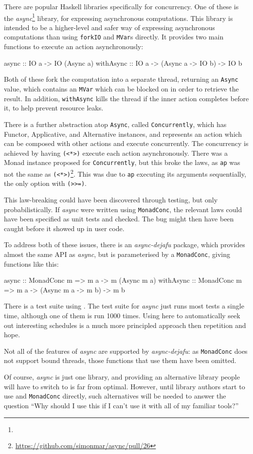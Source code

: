 There are popular Haskell libraries specifically for concurrency. One
of these is the \emph{async}\footnote{} library, for
expressing asynchronous computations. This library is intended to be a
higher-level and safer way of expressing asynchronous computations
than using \verb|forkIO| and \verb|MVar|s directly. It provides two
main functions to execute an action asynchronously:

\begin{haskellcode}
async :: IO a -> IO (Async a)
withAsync :: IO a -> (Async a -> IO b) -> IO b
\end{haskellcode}

Both of these fork the computation into a separate thread, returning
an \verb|Async| value, which contains an \verb|MVar| which can be
blocked on in order to retrieve the result. In addition,
\verb|withAsync| kills the thread if the inner action completes before
it, to help prevent resource leaks.

There is a further abstraction atop \verb|Async|, called
\verb|Concurrently|, which has Functor, Applicative, and Alternative
instances, and represents an action which can be composed with other
actions and execute concurrently. The concurrency is achieved by
having \verb|(<*>)| execute each action asynchronously. There was a
Monad instance proposed for \verb|Concurrently|, but this broke the
laws, as \verb|ap| was not the same as
\verb|(<*>)|\footnote{\url{https://github.com/simonmar/async/pull/26}}. This
was due to \verb|ap| executing its arguments sequentially, the only
option with \verb|(>>=)|.

This law-breaking could have been discovered through testing, but only
probabilistically. If \emph{async} were written using
\verb|MonadConc|, the relevant laws could have been specified as unit
tests and checked. The bug might then have been caught before it
showed up in user code.

To address both of these issues, there is an \emph{async-dejafu}
package, which provides almost the same API as \emph{async}, but is
parameterised by a \verb|MonadConc|, giving functions like this:

\begin{haskellcode}
async :: MonadConc m => m a -> m (Async m a)
withAsync :: MonadConc m => m a -> (Async m a -> m b) -> m b
\end{haskellcode}

There is a test suite using \dejafu{}. The test suite for \emph{async}
just runs most tests a single time, although one of them is run 1000
times. Using \dejafu{} here to automatically seek out interesting
schedules is a much more principled approach then repetition and hope.

Not all of the features of \emph{async} are supported by
\emph{async-dejafu}: as \verb|MonadConc| does not support bound
threads, those functions that use them have been omitted.

Of course, \emph{async} is just one library, and providing an
alternative library people will have to switch to is far from
optimal. However, until library authors start to use \dejafu{} and
\verb|MonadConc| directly, such alternatives will be needed to answer
the question ``Why should I use this if I can't use it with all of my
familiar tools?''
